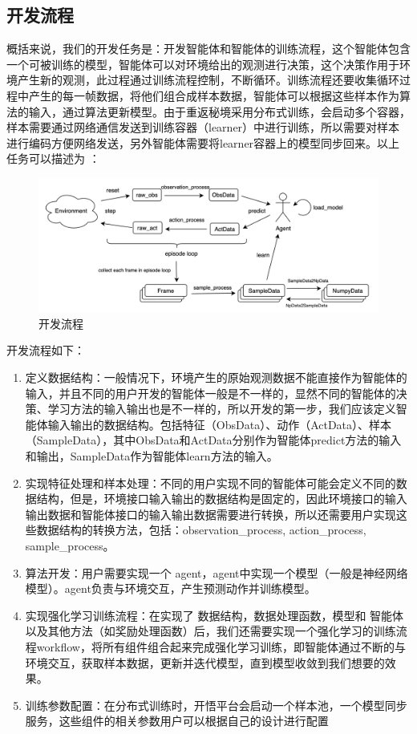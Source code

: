 \subsection{开发流程}

概括来说，我们的开发任务是：开发智能体和智能体的训练流程，这个智能体包含一个可被训练的模型，智能体可以对环境给出的观测进行决策，这个决策作用于环境产生新的观测，此过程通过训练流程控制，不断循环。训练流程还要收集循环过程中产生的每一帧数据，将他们组合成样本数据，智能体可以根据这些样本作为算法的输入，通过算法更新模型。由于重返秘境采用分布式训练，会启动多个容器，样本需要通过网络通信发送到训练容器（learner）中进行训练，所以需要对样本进行编码方便网络发送，另外智能体需要将learner容器上的模型同步回来。以上任务可以描述为 ：

\begin{figure}[H]
    \centering
    \includegraphics[width=1\linewidth]{pic/dev-process.png}
    \caption{ 开发流程}
    \label{dev-process}
\end{figure}

开发流程如下：

\begin{enumerate}
\item 定义数据结构：一般情况下，环境产生的原始观测数据不能直接作为智能体的输入，并且不同的用户开发的智能体一般是不一样的，显然不同的智能体的决策、学习方法的输入输出也是不一样的，所以开发的第一步，我们应该定义智能体输入输出的数据结构。包括特征（ObsData）、动作（ActData）、样本（SampleData），其中ObsData和ActData分别作为智能体predict方法的输入和输出，SampleData作为智能体learn方法的输入。
\item 实现特征处理和样本处理：不同的用户实现不同的智能体可能会定义不同的数据结构，但是，环境接口输入输出的数据结构是固定的，因此环境接口的输入输出数据和智能体接口的输入输出数据需要进行转换，所以还需要用户实现这些数据结构的转换方法，包括：observation\_process, action\_process, sample\_process。
\item 算法开发：用户需要实现一个 agent，agent中实现一个模型（一般是神经网络模型）。agent负责与环境交互，产生预测动作并训练模型。
\item 实现强化学习训练流程：在实现了 数据结构，数据处理函数，模型和 智能体 以及其他方法（如奖励处理函数）后，我们还需要实现一个强化学习的训练流程workflow，将所有组件组合起来完成强化学习训练，即智能体通过不断的与环境交互，获取样本数据，更新并迭代模型，直到模型收敛到我们想要的效果。
\item 训练参数配置：在分布式训练时，开悟平台会启动一个样本池，一个模型同步服务，这些组件的相关参数用户可以根据自己的设计进行配置
\end{enumerate}


